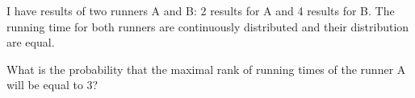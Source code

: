 
\begin{question}
I have results of two runners A and B: 2 results for A and 4 results
for B. The running time for both runners are continuously distributed and their distribution are equal.

What is the probability that the maximal rank of running times of the runner A will be equal to 3?
\end{question}


